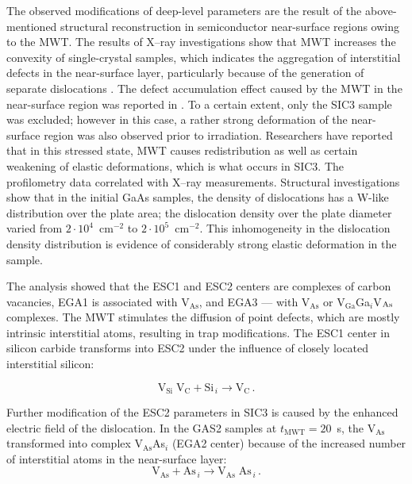 \documentclass[10pt]{iopart}
\begin{document}
The observed modifications of deep-level parameters are the result of the above-mentioned
structural reconstruction in semiconductor near-surface regions  owing to the MWT.
The results of X--ray investigations show that MWT increases the convexity of single-crystal samples,
which indicates the aggregation of interstitial defects in the near-surface layer,
particularly because of the generation of separate dislocations \cite{BoltovetsEn,Konakova2012FTPEn}.
The defect accumulation effect caused by the MWT in the near-surface region  was reported in \cite{BoltovetsEn,Konakova2015En}.
To a certain extent, only the SIC3 sample was excluded;
however in this case, a rather strong deformation of the near-surface region was also observed prior to irradiation.
Researchers have reported \cite{Bacherikov2003En,Pashkov1994En,BoltovetsEn,Milenin1994En,BelyaevIntac} that in this stressed state,
MWT causes redistribution as well as certain weakening of elastic deformations, which is what occurs in SIC3.
The profilometry data correlated with X--ray measurements.
Structural investigations show that
in the initial GaAs samples, the density of dislocations has a W-like distribution over the plate area; the dislocation density over the plate diameter varied from $2\cdot10^{4}$~cm$^{-2}$ to $2\cdot10^{5}$~cm$^{-2}$.
This inhomogeneity in the dislocation density distribution is evidence of  considerably strong elastic deformation in the sample.

The analysis showed that the ESC1 and ESC2 centers are complexes of carbon vacancies,
EGA1 is associated with V$_\mathrm{As}$,
and EGA3 — with V$_\mathrm{As}$ or  V$_\mathrm{Ga}$Ga$_i$V$_{\rm As}$ complexes.
The MWT stimulates the diffusion of point defects, which are mostly intrinsic interstitial atoms, resulting in trap modifications.
The ESC1 center in silicon carbide transforms into ESC2 under the influence of closely located interstitial silicon:

\begin{equation*}
\mathrm{V}_\mathrm{Si}\;\mathrm{V}_\mathrm{C}+\mathrm{Si}_{\,i} \rightarrow
   \mathrm{V}_\mathrm{C}\,.
\end{equation*}

Further modification of the ESC2 parameters in SIC3 is caused by the enhanced electric field of the dislocation.
In the GAS2 samples at $t_\mathrm{MWT}=20$~s,
the V$_\mathrm{As}$ transformed into complex V$_\mathrm{As}$As$_i$
(EGA2 center)
because of the increased number of interstitial atoms in the near-surface layer:
\begin{equation*}
\mathrm{V}_\mathrm{As}+ \mathrm{As}_{\,i} \rightarrow \mathrm{V}_\mathrm{As}\;\mathrm{As}_{\,i}\,.
\end{equation*}
\end{document}
